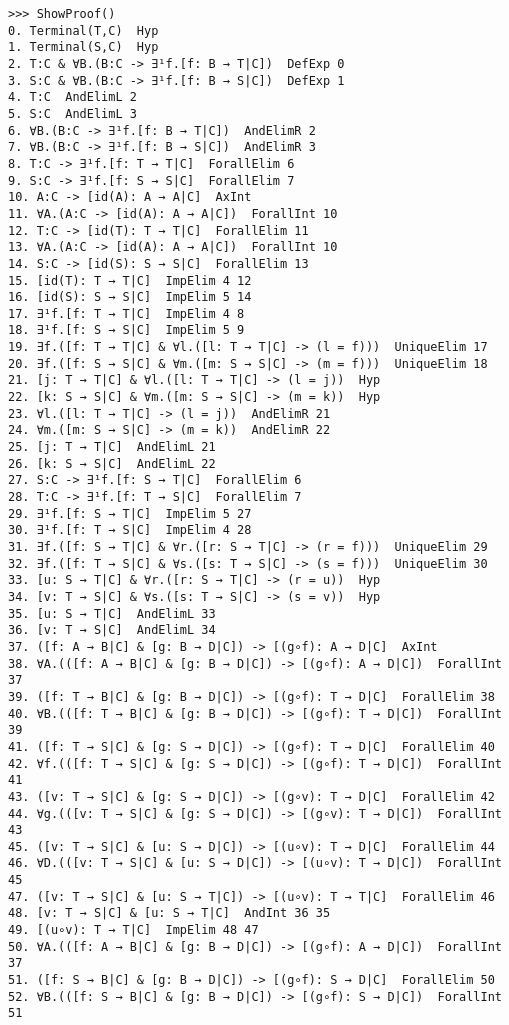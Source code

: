 \documentclass[12pt,leqno]{article}
\numberwithin{equation}{section}
\begin{document}
\begin{verbatim}
>>> ShowProof()
0. Terminal(T,C)  Hyp 
1. Terminal(S,C)  Hyp 
2. T:C & ∀B.(B:C -> ∃¹f.[f: B → T|C])  DefExp 0
3. S:C & ∀B.(B:C -> ∃¹f.[f: B → S|C])  DefExp 1
4. T:C  AndElimL 2
5. S:C  AndElimL 3
6. ∀B.(B:C -> ∃¹f.[f: B → T|C])  AndElimR 2
7. ∀B.(B:C -> ∃¹f.[f: B → S|C])  AndElimR 3
8. T:C -> ∃¹f.[f: T → T|C]  ForallElim 6
9. S:C -> ∃¹f.[f: S → S|C]  ForallElim 7
10. A:C -> [id(A): A → A|C]  AxInt 
11. ∀A.(A:C -> [id(A): A → A|C])  ForallInt 10
12. T:C -> [id(T): T → T|C]  ForallElim 11
13. ∀A.(A:C -> [id(A): A → A|C])  ForallInt 10
14. S:C -> [id(S): S → S|C]  ForallElim 13
15. [id(T): T → T|C]  ImpElim 4 12
16. [id(S): S → S|C]  ImpElim 5 14
17. ∃¹f.[f: T → T|C]  ImpElim 4 8
18. ∃¹f.[f: S → S|C]  ImpElim 5 9
19. ∃f.([f: T → T|C] & ∀l.([l: T → T|C] -> (l = f)))  UniqueElim 17
20. ∃f.([f: S → S|C] & ∀m.([m: S → S|C] -> (m = f)))  UniqueElim 18
21. [j: T → T|C] & ∀l.([l: T → T|C] -> (l = j))  Hyp 
22. [k: S → S|C] & ∀m.([m: S → S|C] -> (m = k))  Hyp 
23. ∀l.([l: T → T|C] -> (l = j))  AndElimR 21
24. ∀m.([m: S → S|C] -> (m = k))  AndElimR 22
25. [j: T → T|C]  AndElimL 21
26. [k: S → S|C]  AndElimL 22
27. S:C -> ∃¹f.[f: S → T|C]  ForallElim 6
28. T:C -> ∃¹f.[f: T → S|C]  ForallElim 7
29. ∃¹f.[f: S → T|C]  ImpElim 5 27
30. ∃¹f.[f: T → S|C]  ImpElim 4 28
31. ∃f.([f: S → T|C] & ∀r.([r: S → T|C] -> (r = f)))  UniqueElim 29
32. ∃f.([f: T → S|C] & ∀s.([s: T → S|C] -> (s = f)))  UniqueElim 30
33. [u: S → T|C] & ∀r.([r: S → T|C] -> (r = u))  Hyp 
34. [v: T → S|C] & ∀s.([s: T → S|C] -> (s = v))  Hyp 
35. [u: S → T|C]  AndElimL 33
36. [v: T → S|C]  AndElimL 34
37. ([f: A → B|C] & [g: B → D|C]) -> [(g∘f): A → D|C]  AxInt 
38. ∀A.(([f: A → B|C] & [g: B → D|C]) -> [(g∘f): A → D|C])  ForallInt 37
39. ([f: T → B|C] & [g: B → D|C]) -> [(g∘f): T → D|C]  ForallElim 38
40. ∀B.(([f: T → B|C] & [g: B → D|C]) -> [(g∘f): T → D|C])  ForallInt 39
41. ([f: T → S|C] & [g: S → D|C]) -> [(g∘f): T → D|C]  ForallElim 40
42. ∀f.(([f: T → S|C] & [g: S → D|C]) -> [(g∘f): T → D|C])  ForallInt 41
43. ([v: T → S|C] & [g: S → D|C]) -> [(g∘v): T → D|C]  ForallElim 42
44. ∀g.(([v: T → S|C] & [g: S → D|C]) -> [(g∘v): T → D|C])  ForallInt 43
45. ([v: T → S|C] & [u: S → D|C]) -> [(u∘v): T → D|C]  ForallElim 44
46. ∀D.(([v: T → S|C] & [u: S → D|C]) -> [(u∘v): T → D|C])  ForallInt 45
47. ([v: T → S|C] & [u: S → T|C]) -> [(u∘v): T → T|C]  ForallElim 46
48. [v: T → S|C] & [u: S → T|C]  AndInt 36 35
49. [(u∘v): T → T|C]  ImpElim 48 47
50. ∀A.(([f: A → B|C] & [g: B → D|C]) -> [(g∘f): A → D|C])  ForallInt 37
51. ([f: S → B|C] & [g: B → D|C]) -> [(g∘f): S → D|C]  ForallElim 50
52. ∀B.(([f: S → B|C] & [g: B → D|C]) -> [(g∘f): S → D|C])  ForallInt 51

\end{verbatim}
\end{document}
